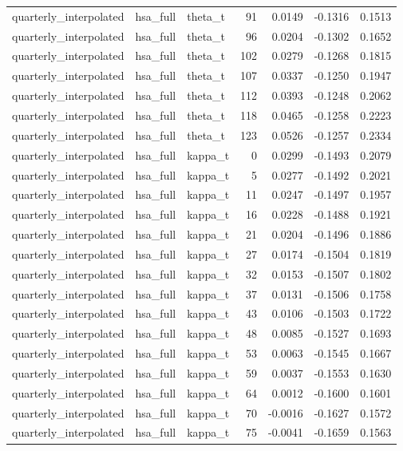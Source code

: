 \begin{tabular}{lllrrrr}
quarterly\_interpolated & hsa\_full & theta\_t & 91 & 0.0149 & -0.1316 & 0.1513 \\
quarterly\_interpolated & hsa\_full & theta\_t & 96 & 0.0204 & -0.1302 & 0.1652 \\
quarterly\_interpolated & hsa\_full & theta\_t & 102 & 0.0279 & -0.1268 & 0.1815 \\
quarterly\_interpolated & hsa\_full & theta\_t & 107 & 0.0337 & -0.1250 & 0.1947 \\
quarterly\_interpolated & hsa\_full & theta\_t & 112 & 0.0393 & -0.1248 & 0.2062 \\
quarterly\_interpolated & hsa\_full & theta\_t & 118 & 0.0465 & -0.1258 & 0.2223 \\
quarterly\_interpolated & hsa\_full & theta\_t & 123 & 0.0526 & -0.1257 & 0.2334 \\
quarterly\_interpolated & hsa\_full & kappa\_t & 0 & 0.0299 & -0.1493 & 0.2079 \\
quarterly\_interpolated & hsa\_full & kappa\_t & 5 & 0.0277 & -0.1492 & 0.2021 \\
quarterly\_interpolated & hsa\_full & kappa\_t & 11 & 0.0247 & -0.1497 & 0.1957 \\
quarterly\_interpolated & hsa\_full & kappa\_t & 16 & 0.0228 & -0.1488 & 0.1921 \\
quarterly\_interpolated & hsa\_full & kappa\_t & 21 & 0.0204 & -0.1496 & 0.1886 \\
quarterly\_interpolated & hsa\_full & kappa\_t & 27 & 0.0174 & -0.1504 & 0.1819 \\
quarterly\_interpolated & hsa\_full & kappa\_t & 32 & 0.0153 & -0.1507 & 0.1802 \\
quarterly\_interpolated & hsa\_full & kappa\_t & 37 & 0.0131 & -0.1506 & 0.1758 \\
quarterly\_interpolated & hsa\_full & kappa\_t & 43 & 0.0106 & -0.1503 & 0.1722 \\
quarterly\_interpolated & hsa\_full & kappa\_t & 48 & 0.0085 & -0.1527 & 0.1693 \\
quarterly\_interpolated & hsa\_full & kappa\_t & 53 & 0.0063 & -0.1545 & 0.1667 \\
quarterly\_interpolated & hsa\_full & kappa\_t & 59 & 0.0037 & -0.1553 & 0.1630 \\
quarterly\_interpolated & hsa\_full & kappa\_t & 64 & 0.0012 & -0.1600 & 0.1601 \\
quarterly\_interpolated & hsa\_full & kappa\_t & 70 & -0.0016 & -0.1627 & 0.1572 \\
quarterly\_interpolated & hsa\_full & kappa\_t & 75 & -0.0041 & -0.1659 & 0.1563 \\

\end{tabular}
